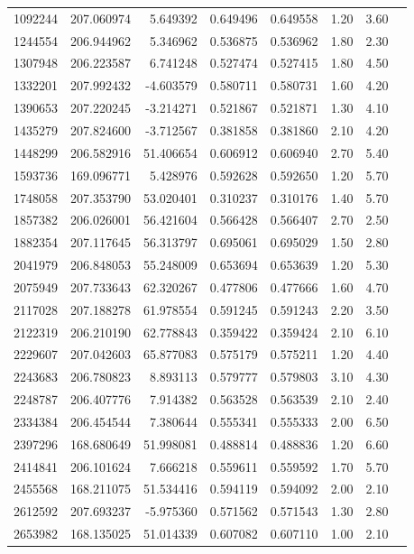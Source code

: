 \begin{longtable}{lrrrrrrr}
1092244 & 207.060974 & 5.649392 & 0.649496 & 0.649558 & 1.20 & 3.60 \\
1244554 & 206.944962 & 5.346962 & 0.536875 & 0.536962 & 1.80 & 2.30 \\
1307948 & 206.223587 & 6.741248 & 0.527474 & 0.527415 & 1.80 & 4.50 \\
1332201 & 207.992432 & -4.603579 & 0.580711 & 0.580731 & 1.60 & 4.20 \\
1390653 & 207.220245 & -3.214271 & 0.521867 & 0.521871 & 1.30 & 4.10 \\
1435279 & 207.824600 & -3.712567 & 0.381858 & 0.381860 & 2.10 & 4.20 \\
1448299 & 206.582916 & 51.406654 & 0.606912 & 0.606940 & 2.70 & 5.40 \\
1593736 & 169.096771 & 5.428976 & 0.592628 & 0.592650 & 1.20 & 5.70 \\
1748058 & 207.353790 & 53.020401 & 0.310237 & 0.310176 & 1.40 & 5.70 \\
1857382 & 206.026001 & 56.421604 & 0.566428 & 0.566407 & 2.70 & 2.50 \\
1882354 & 207.117645 & 56.313797 & 0.695061 & 0.695029 & 1.50 & 2.80 \\
2041979 & 206.848053 & 55.248009 & 0.653694 & 0.653639 & 1.20 & 5.30 \\
2075949 & 207.733643 & 62.320267 & 0.477806 & 0.477666 & 1.60 & 4.70 \\
2117028 & 207.188278 & 61.978554 & 0.591245 & 0.591243 & 2.20 & 3.50 \\
2122319 & 206.210190 & 62.778843 & 0.359422 & 0.359424 & 2.10 & 6.10 \\
2229607 & 207.042603 & 65.877083 & 0.575179 & 0.575211 & 1.20 & 4.40 \\
2243683 & 206.780823 & 8.893113 & 0.579777 & 0.579803 & 3.10 & 4.30 \\
2248787 & 206.407776 & 7.914382 & 0.563528 & 0.563539 & 2.10 & 2.40 \\
2334384 & 206.454544 & 7.380644 & 0.555341 & 0.555333 & 2.00 & 6.50 \\
2397296 & 168.680649 & 51.998081 & 0.488814 & 0.488836 & 1.20 & 6.60 \\
2414841 & 206.101624 & 7.666218 & 0.559611 & 0.559592 & 1.70 & 5.70 \\
2455568 & 168.211075 & 51.534416 & 0.594119 & 0.594092 & 2.00 & 2.10 \\
2612592 & 207.693237 & -5.975360 & 0.571562 & 0.571543 & 1.30 & 2.80 \\
2653982 & 168.135025 & 51.014339 & 0.607082 & 0.607110 & 1.00 & 2.10 \\

\end{longtable}
